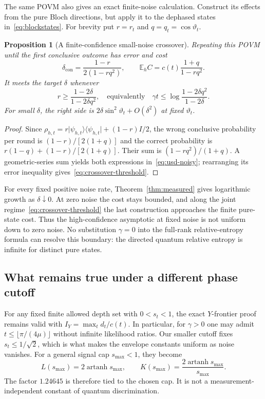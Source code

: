 \documentclass[11pt,a4paper]{article}
\newcommand{\ket}[1]{\lvert #1\rangle}
\newcommand{\bra}[1]{\langle #1\rvert}
\newcommand{\E}{\mathbb E}
\newtheorem{proposition}[theorem]{Proposition}
\theoremstyle{definition}
\theoremstyle{remark}
\numberwithin{equation}{section}
\begin{document}
The same POVM also gives an exact finite-noise calculation. Construct its
effects from the pure Bloch directions, but apply it to the dephased
states in~\eqref{eq:blockstates}. For brevity put $r=r_t$ and
$q=q_t=\cos\vartheta_t$.

\begin{proposition}[A finite-confidence small-noise crossover]\label{prop:crossover}
Repeating this POVM until the first conclusive outcome has error and cost
\begin{equation}\label{eq:usd-noisy}
 \delta_{\mathrm{con}}=\frac{1-r}{2(1-rq^2)},\qquad
 \E_h C=c(t)\frac{1+q}{1-rq^2}.
\end{equation}
It meets the target $\delta$ whenever
\begin{equation}\label{eq:crossover-threshold}
 r\geq\frac{1-2\delta}{1-2\delta q^2},\quad\text{equivalently}\quad
 \gamma t\leq\log\frac{1-2\delta q^2}{1-2\delta}.
\end{equation}
For small $\delta$, the right side is
$2\delta\sin^2\vartheta_t+O(\delta^2)$ at fixed $\vartheta_t$.
\end{proposition}
\begin{proof}
Since $\rho_{h,t}=r\ket{\psi_{h,t}}\bra{\psi_{h,t}}+(1-r)I/2$,
the wrong conclusive probability per round is
$(1-r)/[2(1+q)]$ and the correct probability is
$r(1-q)+(1-r)/[2(1+q)]$.
Their sum is $(1-rq^2)/(1+q)$. A geometric-series sum yields both
expressions in~\eqref{eq:usd-noisy}; rearranging its error inequality
gives~\eqref{eq:crossover-threshold}.
\end{proof}

For every fixed positive noise rate, Theorem~\ref{thm:measured} gives
logarithmic growth as $\delta\downarrow 0$. At zero noise the cost stays
bounded, and along the joint regime~\eqref{eq:crossover-threshold} the
last construction approaches the finite pure-state cost. Thus the
high-confidence asymptotic at fixed noise is not uniform down to zero
noise. No substitution $\gamma=0$ into the full-rank relative-entropy
formula can resolve this boundary: the directed quantum relative
entropy is infinite for distinct pure states.

\subsection{What remains true under a different phase cutoff}
For any fixed finite allowed depth set with $0<s_t<1$, the exact
$Y$-frontier proof remains valid with
$I_Y=\max_t d_t/c(t)$. In particular, for $\gamma>0$ one may admit
$t\leq\lfloor\pi/(4\mu)\rfloor$ without infinite likelihood ratios.
Our smaller cutoff fixes $s_t\leq1/\sqrt2$, which is what makes the
envelope constants uniform as noise vanishes. For a general signal cap
$s_{\max}<1$, they become
\[
 L(s_{\max})=2\operatorname{artanh}s_{\max},\qquad
 K(s_{\max})=\frac{2\operatorname{artanh}s_{\max}}{s_{\max}}.
\]
The factor $1.24645$ is therefore tied to the chosen cap. It is not a
measurement-independent constant of quantum discrimination.
\end{document}
